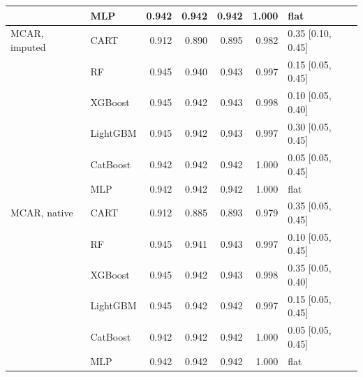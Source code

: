 \begin{table}[p]
\begin{tabular}{@{}llrrrrl@{}}
 & MLP & 0.942 & 0.942 & 0.942 & 1.000 & flat \\
\midrule
MCAR, imputed & CART & 0.912 & 0.890 & 0.895 & 0.982 & 0.35 [0.10, 0.45] \\
 & RF & 0.945 & 0.940 & 0.943 & 0.997 & 0.15 [0.05, 0.45] \\
 & XGBoost & 0.945 & 0.942 & 0.943 & 0.998 & 0.10 [0.05, 0.40] \\
 & LightGBM & 0.945 & 0.942 & 0.943 & 0.997 & 0.30 [0.05, 0.45] \\
 & CatBoost & 0.942 & 0.942 & 0.942 & 1.000 & 0.05 [0.05, 0.45] \\
 & MLP & 0.942 & 0.942 & 0.942 & 1.000 & flat \\
\midrule
MCAR, native & CART & 0.912 & 0.885 & 0.893 & 0.979 & 0.35 [0.05, 0.45] \\
 & RF & 0.945 & 0.941 & 0.943 & 0.997 & 0.10 [0.05, 0.45] \\
 & XGBoost & 0.945 & 0.942 & 0.943 & 0.998 & 0.35 [0.05, 0.40] \\
 & LightGBM & 0.945 & 0.942 & 0.942 & 0.997 & 0.15 [0.05, 0.45] \\
 & CatBoost & 0.942 & 0.942 & 0.942 & 1.000 & 0.05 [0.05, 0.45] \\
 & MLP & 0.942 & 0.942 & 0.942 & 1.000 & flat \\
\bottomrule
\end{tabular}
\end{table}

